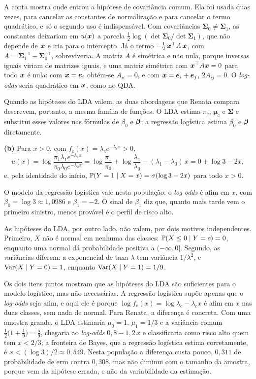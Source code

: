 \begin{solucao}
A conta mostra onde entrou a hipótese de covariância comum. Ela foi usada duas vezes, para
cancelar as constantes de normalização e para cancelar o termo quadrático, e só o segundo uso
é indispensável. Com covariâncias $\bm\Sigma_0\ne\bm\Sigma_1$, as constantes deixariam em
$u(\bm{x})$ a parcela $\tfrac12\log(\det\bm\Sigma_0/\det\bm\Sigma_1)$, que não depende de $\bm{x}$ e
iria para o intercepto. Já o termo $-\tfrac12\,\bm{x}^\top A\,\bm{x}$, com
$A=\bm\Sigma_1^{-1}-\bm\Sigma_0^{-1}$, sobreviveria. A matriz $A$ é simétrica e não nula,
porque inversas iguais viriam de matrizes iguais, e uma matriz simétrica com $\bm{x}^\top A\bm{x}=0$
para todo $\bm{x}$ é nula: com $\bm{x}=\bm e_i$ obtém-se $A_{ii}=0$, e com $\bm{x}=\bm e_i+\bm e_j$,
$2A_{ij}=0$. O \emph{log-odds} seria quadrático em $\bm{x}$, como no QDA.

Quando as hipóteses do LDA valem, as duas abordagens que Renata compara descrevem, portanto, a
mesma família de funções. O LDA estima $\pi_c$, $\bm\mu_c$ e $\bm\Sigma$ e substitui esses
valores nas fórmulas de $\beta_0$ e $\bm{\beta}$; a regressão logística estima $\beta_0$ e $\bm{\beta}$
diretamente.

\smallskip
\textbf{(b)} Para $x>0$, com $f_c(x)=\lambda_ce^{-\lambda_cx}>0$,
\[
  u(x)=\log\frac{\pi_1\lambda_1e^{-\lambda_1x}}{\pi_0\lambda_0e^{-\lambda_0x}}
      =\log\frac{\pi_1}{\pi_0}+\log\frac{\lambda_1}{\lambda_0}-(\lambda_1-\lambda_0)\,x
      =0+\log3-2x ,
\]
e, pela identidade do início, $\mathbb{P}(Y=1\mid X=x)=\sigma(\log3-2x)$ para todo $x>0$.

O modelo da regressão logística vale nesta população: o \emph{log-odds} é afim em $x$, com
$\beta_0=\log3\approx1{,}0986$ e $\beta_1=-2$. O sinal de $\beta_1$ diz que, quanto mais tarde
vem o primeiro sinistro, menos provável é o perfil de risco alto.

As hipóteses do LDA, por outro lado, não valem, por dois motivos independentes. Primeiro, $X$
não é normal em nenhuma das classes: $\mathbb{P}(X\le0\mid Y=c)=0$, enquanto uma normal dá
probabilidade positiva a $(-\infty,0]$. Segundo, as variâncias diferem: a exponencial de taxa
$\lambda$ tem variância $1/\lambda^2$, e $\operatorname{Var}(X\mid Y=0)=1$, enquanto $\operatorname{Var}(X\mid Y=1)=1/9$.

Os dois itens juntos mostram que as hipóteses do LDA são suficientes para o modelo logístico,
mas não necessárias. A regressão logística supõe apenas que o \emph{log-odds} seja afim, e
aqui ele é porque $\log f_c(x)=\log\lambda_c-\lambda_cx$ é afim em $x$ nas duas classes, sem
nada de normal. Para Renata, a diferença é concreta. Com uma amostra grande, o LDA estimaria
$\mu_0=1$, $\mu_1=1/3$ e a variância comum $\tfrac12\big(1+\tfrac19\big)=\tfrac59$, chegaria ao
\emph{log-odds} $0{,}8-1{,}2\,x$ e classificaria como risco alto quem tem $x<2/3$; a fronteira de
Bayes, que a regressão logística estima corretamente, é $x<(\log3)/2\approx0{,}549$. Nesta
população a diferença custa pouco, $0{,}311$ de probabilidade de erro contra $0{,}308$, mas não
diminui com o tamanho da amostra, porque vem da hipótese errada, e não da variabilidade da
estimação.
\end{solucao}
